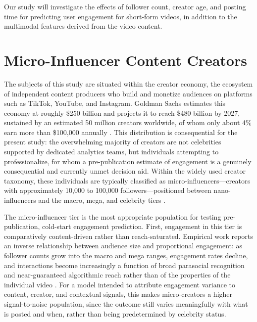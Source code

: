 
Our study will investigate the effects of follower count, creator age, and posting time for predicting user engagement for short-form videos, in addition to the multimodal features derived from the video content. 


\section{Micro-Influencer Content Creators}
The subjects of this study are situated within the creator economy, the ecosystem of independent content producers who build and monetize audiences on platforms such as TikTok, YouTube, and Instagram. Goldman Sachs estimates this economy at roughly \$250 billion and projects it to reach \$480 billion by 2027, sustained by an estimated 50 million creators worldwide, of whom only about 4\% earn more than \$100,000 annually \cite{creator_economy_2027}. This distribution is consequential for the present study: the overwhelming majority of creators are not celebrities supported by dedicated analytics teams, but individuals attempting to professionalize, for whom a pre-publication estimate of engagement is a genuinely consequential and currently unmet decision aid. Within the widely used creator taxonomy, these individuals are typically classified as micro-influencers—creators with approximately 10,000 to 100,000 followers—positioned between nano-influencers and the macro, mega, and celebrity tiers \cite{anymindgroup_2026_state, Campbell_Farrell_2020}.

The micro-influencer tier is the most appropriate population for testing pre-publication, cold-start engagement prediction. First, engagement in this tier is comparatively content-driven rather than reach-saturated. Empirical work reports an inverse relationship between audience size and proportional engagement: as follower counts grow into the macro and mega ranges, engagement rates decline, and interactions become increasingly a function of broad parasocial recognition and near-guaranteed algorithmic reach rather than of the properties of the individual video \cite{De_Veirman_Cauberghe_Hudders_2017, Conde_Casais_2023}. For a model intended to attribute engagement variance to content, creator, and contextual signals, this makes micro-creators a higher signal-to-noise population, since the outcome still varies meaningfully with what is posted and when, rather than being predetermined by celebrity status.

